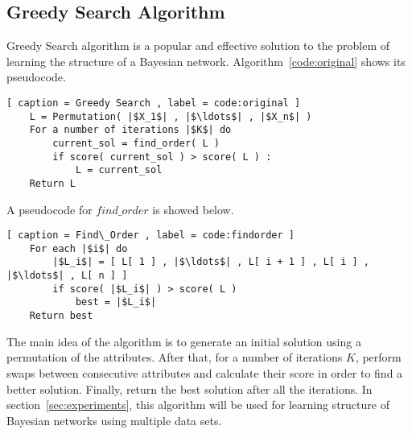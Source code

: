 \subsection{Greedy Search Algorithm}
\label{subsec:greedysearch}

Greedy Search algorithm is a popular and effective solution to the problem of learning the structure of a Bayesian network. Algorithm~\ref{code:original} shows its pseudocode.

\begin{lstlisting}[ caption = Greedy Search , label = code:original ]
	L = Permutation( |$X_1$| , |$\ldots$| , |$X_n$| )
	For a number of iterations |$K$| do
		current_sol = find_order( L )
		if score( current_sol ) > score( L ) :
			L = current_sol
	Return L
\end{lstlisting}

A pseudocode for ${find\_order}$ is showed below.

\begin{lstlisting}[ caption = Find\_Order , label = code:findorder ]
	For each |$i$| do
		|$L_i$| = [ L[ 1 ] , |$\ldots$| , L[ i + 1 ] , L[ i ] , |$\ldots$| , L[ n ] ]
		if score( |$L_i$| ) > score( L )
			best = |$L_i$|
	Return best
\end{lstlisting}

The main idea of the algorithm is to generate an initial solution using a permutation of the attributes. After that, for a number of iterations $K$, perform swaps between consecutive attributes and calculate their score in order to find a better solution. Finally, return the best solution after all the iterations. In section~\ref{sec:experiments}, this algorithm will be used for learning structure of Bayesian networks using multiple data sets.